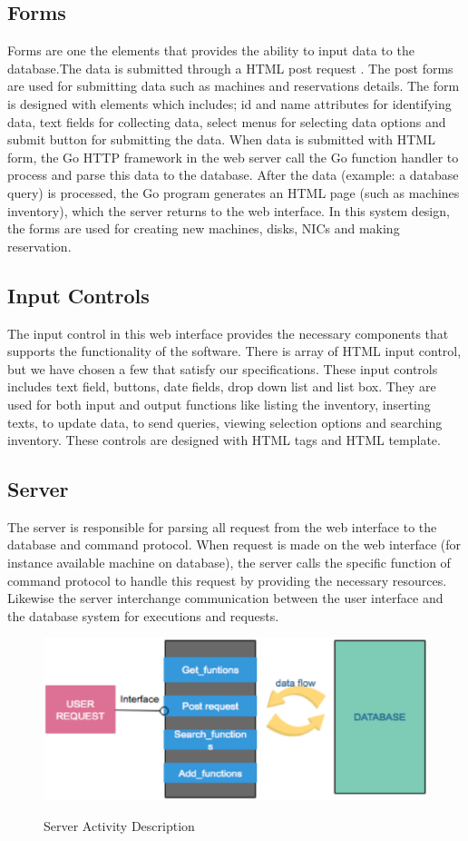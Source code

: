 \subsection*{Forms}
 Forms are one the elements that provides the ability to input data to the database.The data is submitted through a HTML post request \cite{WinNT}. The post forms are used for submitting data such as machines and reservations details. The form is designed with elements which includes; id and name attributes for identifying data, text fields for collecting data, select menus for selecting data options and submit button for submitting the data. When data is submitted with HTML form, the Go HTTP framework in the web server call the Go function handler to process and parse this data to the database.  After the data (example: a database query) is processed, the Go program generates an HTML page (such as machines inventory), which the server returns to the web interface. In this system design, the forms are used for creating new machines, disks, NICs and making reservation. 
\subsection*{Input Controls}
The input control in this web interface provides the necessary components that supports the functionality of the software. There is array of HTML input control, but we have chosen a few that satisfy our specifications. These input controls includes text field, buttons, date fields, drop down list and list box. They are used for both input and output functions like listing the inventory, inserting texts, to update data, to send queries, viewing selection options and searching inventory. These controls are designed with HTML tags and HTML template.
\subsection{Server}
The server is responsible for parsing all request from the web interface to the database and command protocol. When request is made on the web interface (for instance available machine on database), the server calls the  specific function of command protocol to handle this request by providing the necessary resources. Likewise the server interchange communication between the user interface and the database system for executions and requests. 
\begin{figure}[h!]
\includegraphics[width = \linewidth]{Server.eps}
\label{fig:Description of Server Activity} 
\caption{Server Activity Description}
\end{figure}
